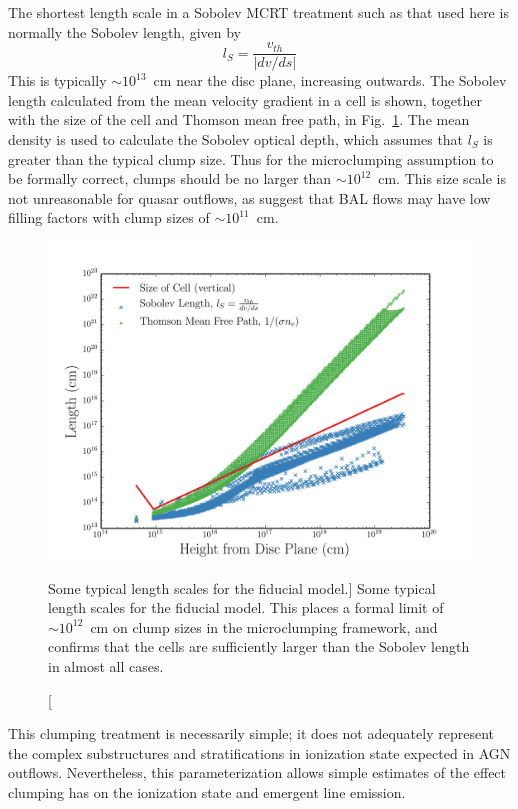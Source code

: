 The shortest length scale in a Sobolev MCRT treatment such as that used here
is normally the Sobolev length, given by 
\begin{equation}
l_S = \frac{v_{th}}{| dv/ds |}
\end{equation}
This is typically $\sim10^{13}$~cm near the disc plane, increasing outwards.
The Sobolev length calculated from the mean velocity gradient in a cell
is shown, together with the size of the cell
and Thomson mean free path, in Fig.~\ref{fig:length_scales}.
The mean density is used to calculate the Sobolev optical depth, 
which assumes that $l_S$ is greater than the typical clump size.
Thus for the microclumping assumption to be formally correct, 
clumps should be no larger than $\sim10^{12}$~cm.
This size scale is not unreasonable for quasar outflows, as
\cite{dekool1995} suggest that BAL flows may have low filling factors with
clump sizes of $\sim10^{11}$~cm.

\begin{figure} 
\centering
\includegraphics[width=1.0\textwidth]{figures/06-agnpaper/size_of_clumps.png}
\caption
[Some typical length scales for the fiducial model.]
{
Some typical length scales for the fiducial model. 
This places a formal limit of $\sim10^{12}$~cm on clump sizes 
in the microclumping framework, and confirms that the cells are sufficiently
larger than the Sobolev length in almost all cases.
}
\label{fig:length_scales}
\end{figure} 

This clumping treatment is necessarily simple; it does not adequately
represent the complex substructures and stratifications in ionization
state expected in AGN outflows. 
Nevertheless, this parameterization 
allows simple estimates of the effect clumping has on the ionization 
state and emergent line emission.


